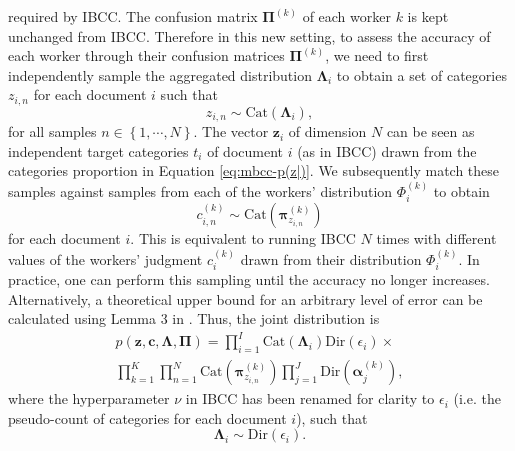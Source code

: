 \documentclass{article}
\begin{document}
required by IBCC. The confusion matrix $\boldsymbol{\Pi}^{(k)}$ of
each worker $k$ is kept unchanged from IBCC. Therefore in this new
setting, to assess the accuracy of each worker through their confusion
matrices $\boldsymbol{\Pi}^{(k)}$, we need to first independently
sample the aggregated distribution $\boldsymbol{\Lambda}_{i}$ to
obtain a set of categories $z_{i,n}$ for each document $i$ such
that 
\begin{equation}
z_{i,n}\sim\mbox{Cat}\left(\boldsymbol{\Lambda}_{i}\right),\label{eq:mbcc-p(z|)}
\end{equation}
for all samples $n\in\left\{ 1,\cdots,N\right\} $. The vector $\mathbf{z}_{i}$
of dimension $N$ can be seen as independent target categories $t_{i}$
of document $i$ (as in IBCC) drawn from the categories proportion
in Equation \ref{eq:mbcc-p(z|)}. We subsequently match these samples
against samples from each of the workers' distribution $\Phi_{i}^{(k)}$
to obtain 
\begin{equation}
c_{i,n}^{(k)}\sim\mbox{Cat}\left(\boldsymbol{\pi}_{z_{i,n}}^{(k)}\right)\label{eq:mbcc-p(c|)}
\end{equation}
for each document $i$. This is equivalent to running IBCC $N$ times
with different values of the workers' judgment $c_{i}^{(k)}$ drawn
from their distribution $\Phi_{i}^{(k)}$. In practice, one can perform
this sampling until the accuracy no longer increases. Alternatively,
a theoretical upper bound for an arbitrary level of error can be calculated
using Lemma 3 in \cite{devroye1983equivalence}. Thus, the joint
distribution is
\begin{multline}
p\left(\mathbf{z},\mathbf{c},\boldsymbol{\Lambda},\boldsymbol{\Pi}\right)=\prod_{i=1}^{I}\mbox{Cat}\left(\boldsymbol{\Lambda}_{i}\right)\mbox{Dir}\left(\epsilon_{i}\right)\times\\
\prod_{k=1}^{K}\prod_{n=1}^{N}\mbox{Cat}\left(\boldsymbol{\pi}_{z_{i,n}}^{(k)}\right)\prod_{j=1}^{J}\mbox{Dir}\left(\boldsymbol{\alpha}_{j}^{(k)}\right),\label{eq:mbcc-joint}
\end{multline}
where the hyperparameter $\nu$ in IBCC has been renamed for clarity
to $\epsilon_{i}$ (i.e. the pseudo-count of categories for each document
$i$), such that
\begin{equation}
\boldsymbol{\Lambda}_{i}\sim\mbox{Dir}\left(\epsilon_{i}\right).\label{eq:mbcc-p(lambda)}
\end{equation}
\end{document}
